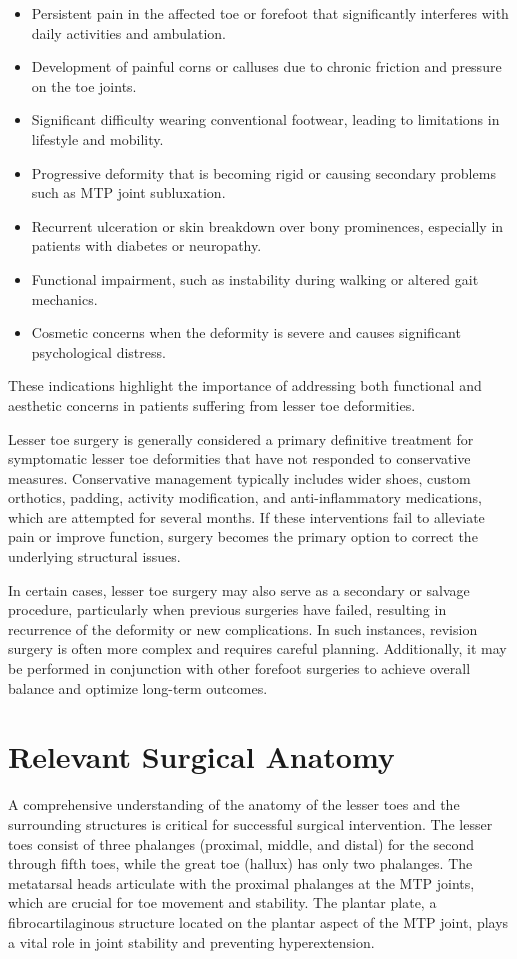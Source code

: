 \begin{itemize}
  \item Persistent pain in the affected toe or forefoot that significantly interferes with daily activities and ambulation.
  \item Development of painful corns or calluses due to chronic friction and pressure on the toe joints.
  \item Significant difficulty wearing conventional footwear, leading to limitations in lifestyle and mobility.
  \item Progressive deformity that is becoming rigid or causing secondary problems such as MTP joint subluxation.
  \item Recurrent ulceration or skin breakdown over bony prominences, especially in patients with diabetes or neuropathy.
  \item Functional impairment, such as instability during walking or altered gait mechanics.
  \item Cosmetic concerns when the deformity is severe and causes significant psychological distress.
\end{itemize}

These indications highlight the importance of addressing both functional and aesthetic concerns in patients suffering from lesser toe deformities.

Lesser toe surgery is generally considered a primary definitive treatment for symptomatic lesser toe deformities that have not responded to conservative measures. Conservative management typically includes wider shoes, custom orthotics, padding, activity modification, and anti-inflammatory medications, which are attempted for several months. If these interventions fail to alleviate pain or improve function, surgery becomes the primary option to correct the underlying structural issues.

In certain cases, lesser toe surgery may also serve as a secondary or salvage procedure, particularly when previous surgeries have failed, resulting in recurrence of the deformity or new complications. In such instances, revision surgery is often more complex and requires careful planning. Additionally, it may be performed in conjunction with other forefoot surgeries to achieve overall balance and optimize long-term outcomes.

\section*{Relevant Surgical Anatomy}
A comprehensive understanding of the anatomy of the lesser toes and the surrounding structures is critical for successful surgical intervention. The lesser toes consist of three phalanges (proximal, middle, and distal) for the second through fifth toes, while the great toe (hallux) has only two phalanges. The metatarsal heads articulate with the proximal phalanges at the MTP joints, which are crucial for toe movement and stability. The plantar plate, a fibrocartilaginous structure located on the plantar aspect of the MTP joint, plays a vital role in joint stability and preventing hyperextension. 

